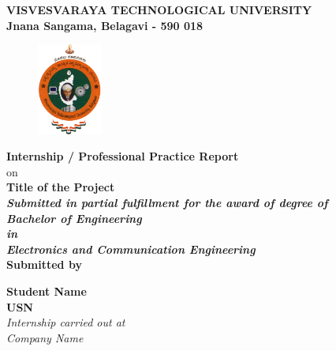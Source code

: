 
\begin{titlingpage}
	\thispagestyle{empty}\centering
	\pagecolor{rnspurple}\afterpage{\nopagecolor}
	
	\setlength{\toptafiddle}{1in}
	\setlength{\bottafiddle}{1in}
	\vspace*{-1.25in}
	\enlargethispage{\toptafiddle}
	\large 
	\textbf{VISVESVARAYA TECHNOLOGICAL UNIVERSITY\\
		Jnana Sangama, Belagavi - 590 018}\\
	\vspace{0.2cm}
	\begin{figure}[h]
		\centering
		\includegraphics[height=3cm]{images/vtu.png}
	\end{figure}
	\textbf{\color{red}Internship / Professional Practice Report}\\
	{\color{red}on}\\
	
	\Large{\textbf{\color{blue}Title of the Project}}\\
	\small{\textit{\textbf{\color{red}Submitted in partial fulfillment for the award of degree of}}}\\
	
	\vspace{0.2cm}
	\textit{\textbf{\color{blue}Bachelor of Engineering\\ in \\Electronics and Communication Engineering}}
	\vspace{0.5cm}\\
	\textbf{Submitted by}
	
	
	\begin{center}
		\Large\textbf{\color{blue}Student Name}\\
		\Large\textbf{\color{blue}USN}\\
		
		\textit{\color{red}Internship carried out at}\\
		
		\textit{\color{blue}Company Name}\\
	\end{center}
	\vspace{0.3cm}
	

\end{titlingpage}
